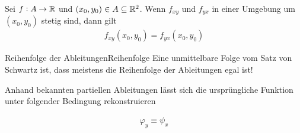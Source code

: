 \documentclass[12pt]{article}
\begin{document}
\begin{thmb}{\emph{}}
        Sei $f:A\to\mathbb{R}$ und $(x_0,y_0)\in A\subseteq\mathbb{R}^2$. Wenn $f_{xy}$ und $f_{yx}$ in einer Umgebung um $(x_0,y_0)$ stetig sind, dann gilt
        \begin{align}
                f_{xy}(x_0,y_0)=f_{yx}(x_0,y_0)
        \end{align}
\end{thmb}

\begin{rmk}{Reihenfolge der Ableitungen}{Reihenfolge}
        Eine unmittelbare Folge vom Satz von Schwartz ist, dass meistens die Reihenfolge der Ableitungen egal ist!
\end{rmk}

\begin{figure}[htbp!]
        \centering
\end{figure}

Anhand bekannten partiellen Ableitungen lässt sich die ursprüngliche Funktion
unter folgender Bedingung rekonstruieren

\begin{thmb}{\emph{}}
        \begin{align}
                \varphi_y\equiv\psi_x
        \end{align}
\end{thmb}\vspace*{1em}
\end{document}
